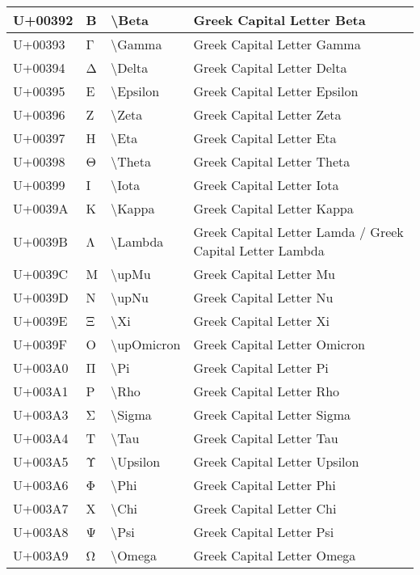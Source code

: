 \begin{table}[h]
\begin{tabulary}{\linewidth}{|L|L|L|L|}
\hline
U+00392 & Β & {\textbackslash}Beta & Greek Capital Letter Beta \\
\hline
U+00393 & Γ & {\textbackslash}Gamma & Greek Capital Letter Gamma \\
\hline
U+00394 & Δ & {\textbackslash}Delta & Greek Capital Letter Delta \\
\hline
U+00395 & Ε & {\textbackslash}Epsilon & Greek Capital Letter Epsilon \\
\hline
U+00396 & Ζ & {\textbackslash}Zeta & Greek Capital Letter Zeta \\
\hline
U+00397 & Η & {\textbackslash}Eta & Greek Capital Letter Eta \\
\hline
U+00398 & Θ & {\textbackslash}Theta & Greek Capital Letter Theta \\
\hline
U+00399 & Ι & {\textbackslash}Iota & Greek Capital Letter Iota \\
\hline
U+0039A & Κ & {\textbackslash}Kappa & Greek Capital Letter Kappa \\
\hline
U+0039B & Λ & {\textbackslash}Lambda & Greek Capital Letter Lamda / Greek Capital Letter Lambda \\
\hline
U+0039C & Μ & {\textbackslash}upMu & Greek Capital Letter Mu \\
\hline
U+0039D & Ν & {\textbackslash}upNu & Greek Capital Letter Nu \\
\hline
U+0039E & Ξ & {\textbackslash}Xi & Greek Capital Letter Xi \\
\hline
U+0039F & Ο & {\textbackslash}upOmicron & Greek Capital Letter Omicron \\
\hline
U+003A0 & Π & {\textbackslash}Pi & Greek Capital Letter Pi \\
\hline
U+003A1 & Ρ & {\textbackslash}Rho & Greek Capital Letter Rho \\
\hline
U+003A3 & Σ & {\textbackslash}Sigma & Greek Capital Letter Sigma \\
\hline
U+003A4 & Τ & {\textbackslash}Tau & Greek Capital Letter Tau \\
\hline
U+003A5 & Υ & {\textbackslash}Upsilon & Greek Capital Letter Upsilon \\
\hline
U+003A6 & Φ & {\textbackslash}Phi & Greek Capital Letter Phi \\
\hline
U+003A7 & Χ & {\textbackslash}Chi & Greek Capital Letter Chi \\
\hline
U+003A8 & Ψ & {\textbackslash}Psi & Greek Capital Letter Psi \\
\hline
U+003A9 & Ω & {\textbackslash}Omega & Greek Capital Letter Omega \\

\end{tabulary}
\end{table}
